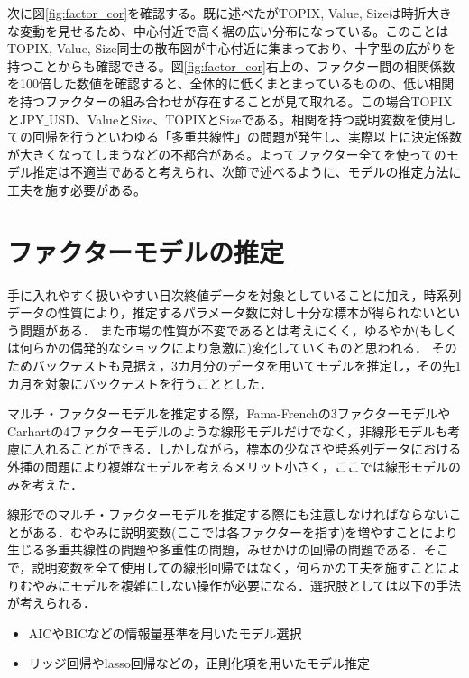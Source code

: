 \documentclass[11pt]{jreport}
\begin{document}
次に図\ref{fig:factor_cor}を確認する。既に述べたがTOPIX, Value, Sizeは時折大きな変動を見せるため、中心付近で高く裾の広い分布になっている。このことはTOPIX, Value, Size同士の散布図が中心付近に集まっており、十字型の広がりを持つことからも確認できる。図\ref{fig:factor_cor}右上の、ファクター間の相関係数を100倍した数値を確認すると、全体的に低くまとまっているものの、低い相関を持つファクターの組み合わせが存在することが見て取れる。この場合TOPIXとJPY$\_$USD、ValueとSize、TOPIXとSizeである。相関を持つ説明変数を使用しての回帰を行うといわゆる「多重共線性」の問題が発生し、実際以上に決定係数が大きくなってしまうなどの不都合がある。よってファクター全てを使ってのモデル推定は不適当であると考えられ、次節で述べるように、モデルの推定方法に工夫を施す必要がある。

\section{ファクターモデルの推定}
手に入れやすく扱いやすい日次終値データを対象としていることに加え，時系列データの性質により，推定するパラメータ数に対し十分な標本が得られないという問題がある．
また市場の性質が不変であるとは考えにくく，ゆるやか(もしくは何らかの偶発的なショックにより急激に)変化していくものと思われる．
そのためバックテストも見据え，3カ月分のデータを用いてモデルを推定し，その先1カ月を対象にバックテストを行うこととした．

マルチ・ファクターモデルを推定する際，Fama-Frenchの3ファクターモデルやCarhartの4ファクターモデルのような線形モデルだけでなく，非線形モデルも考慮に入れることができる．しかしながら，標本の少なさや時系列データにおける外挿の問題により複雑なモデルを考えるメリット小さく，ここでは線形モデルのみを考えた．

線形でのマルチ・ファクターモデルを推定する際にも注意しなければならないことがある．むやみに説明変数(ここでは各ファクターを指す)を増やすことにより生じる多重共線性の問題や多重性の問題，みせかけの回帰の問題である．そこで，説明変数を全て使用しての線形回帰ではなく，何らかの工夫を施すことによりむやみにモデルを複雑にしない操作が必要になる．選択肢としては以下の手法が考えられる．

\begin{itemize}
\item AICやBICなどの情報量基準を用いたモデル選択
\item リッジ回帰やlasso回帰などの，正則化項を用いたモデル推定
\end{itemize}
\end{document}
